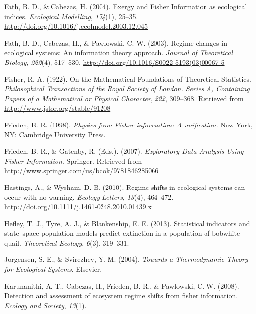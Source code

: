 \documentclass[12pt,twoside]{reedthesis}
\begin{document}
\leavevmode\hypertarget{ref-fath_exergy_2004}{}%
Fath, B. D., \& Cabezas, H. (2004). Exergy and Fisher Information as ecological indices. \emph{Ecological Modelling}, \emph{174}(1), 25--35. \url{http://doi.org/10.1016/j.ecolmodel.2003.12.045}

\leavevmode\hypertarget{ref-fath_regime_2003}{}%
Fath, B. D., Cabezas, H., \& Pawlowski, C. W. (2003). Regime changes in ecological systems: An information theory approach. \emph{Journal of Theoretical Biology}, \emph{222}(4), 517--530. \url{http://doi.org/10.1016/S0022-5193(03)00067-5}

\leavevmode\hypertarget{ref-fisher_mathematical_1922}{}%
Fisher, R. A. (1922). On the Mathematical Foundations of Theoretical Statistics. \emph{Philosophical Transactions of the Royal Society of London. Series A, Containing Papers of a Mathematical or Physical Character}, \emph{222}, 309--368. Retrieved from \url{http://www.jstor.org/stable/91208}

\leavevmode\hypertarget{ref-frieden_physics_1998}{}%
Frieden, B. R. (1998). \emph{Physics from Fisher information: A unification.} New York, NY: Cambridge University Press.

\leavevmode\hypertarget{ref-frieden_exploratory_2007}{}%
Frieden, B. R., \& Gatenby, R. (Eds.). (2007). \emph{Exploratory Data Analysis Using Fisher Information}. Springer. Retrieved from \url{http://www.springer.com/us/book/9781846285066}

\leavevmode\hypertarget{ref-hastings_regime_2010}{}%
Hastings, A., \& Wysham, D. B. (2010). Regime shifts in ecological systems can occur with no warning. \emph{Ecology Letters}, \emph{13}(4), 464--472. \url{http://doi.org/10.1111/j.1461-0248.2010.01439.x}

\leavevmode\hypertarget{ref-hefley2013statistical}{}%
Hefley, T. J., Tyre, A. J., \& Blankenship, E. E. (2013). Statistical indicators and state--space population models predict extinction in a population of bobwhite quail. \emph{Theoretical Ecology}, \emph{6}(3), 319--331.

\leavevmode\hypertarget{ref-jorgensen_towards_2004}{}%
Jorgensen, S. E., \& Svirezhev, Y. M. (2004). \emph{Towards a Thermodynamic Theory for Ecological Systems}. Elsevier.

\leavevmode\hypertarget{ref-karunanithi_detection_2008}{}%
Karunanithi, A. T., Cabezas, H., Frieden, B. R., \& Pawlowski, C. W. (2008). Detection and assessment of ecosystem regime shifts from fisher information. \emph{Ecology and Society}, \emph{13}(1).
\end{document}
